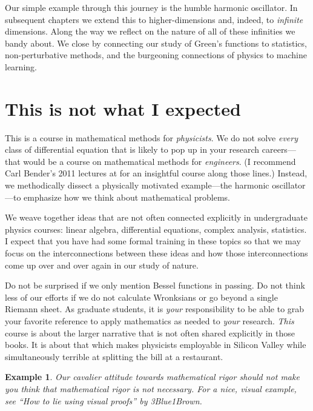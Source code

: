 \documentclass[
  11pt,
	colorful,
	raggedright,
]{tufte-style-thesis-flip}
\newtheorem{example}{Example}[section]
\begin{document}
Our simple example through this journey is the humble harmonic oscillator. In subsequent chapters we extend this to higher-dimensions and, indeed, to \emph{infinite} dimensions. Along the way we reflect on the nature of all of these infinities we bandy about. We close by connecting our study of Green's functions to statistics, non-perturbative methods, and the burgeoning connections of physics to machine learning.

\section{This is not what I expected}


This is a course in mathematical methods for \emph{physicists}.
%
We do not solve \emph{every} class of differential equation that is likely to pop up in your research careers---that would be a course on mathematical methods for \emph{engineers}. (I recommend Carl Bender's 2011 lectures at  for an insightful course along those lines.) Instead, we methodically dissect a physically motivated example---the harmonic oscillator---to emphasize how we think about mathematical problems. 

We weave together ideas that are not often connected explicitly in undergraduate physics courses: linear algebra, differential equations, complex analysis, statistics. I expect that you have had some formal training in these topics so that we may focus on the interconnections between these ideas and how those interconnections come up over and over again in our study of nature.

Do not be surprised if we only mention Bessel functions in passing. Do not think less of our efforts if we do not calculate Wronksians or go beyond a single Riemann sheet. As graduate students, it is \emph{your} responsibility to be able to grab your favorite reference to apply mathematics as needed to \emph{your} research. \emph{This} course is about the larger narrative that is not often shared explicitly in those books. It is about that which makes physicists employable in Silicon Valley while simultaneously terrible at splitting the bill at a restaurant. 

\begin{example}
Our cavalier attitude towards mathematical rigor should not make you think that mathematical rigor is not necessary. For a nice, visual example, see ``How to lie using visual proofs'' by 3Blue1Brown.\cite{3Blue1Brown_2022}
\end{example}
 
\end{document}

